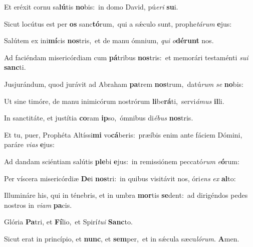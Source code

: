 
Et eréxit cornu sa\textbf{lú}tis \textbf{no}bis:~\redgreheightstar in domo David, pú\textit{e}\textit{ri} \textbf{su}i.

Sicut locútus est per \textbf{os} sanc\textbf{tó}rum,~\redgreheightstar qui a sǽculo sunt, prophe\textit{tá}\textit{rum} \textbf{e}jus:

Salútem ex ini\textbf{mí}cis \textbf{nos}tris,~\redgreheightstar et de manu ómnium, \textit{qui} \textit{o}\textbf{dé}\textbf{runt} nos.

Ad faciéndam misericórdiam cum \textbf{pá}tribus \textbf{nos}tris:~\redgreheightstar et memorári testaménti \textit{su}\textit{i} \textbf{sanc}ti.

Jusjurándum, quod jurávit ad Abraham \textbf{pa}trem \textbf{nos}trum,~\redgreheightstar datú\textit{rum} \textit{se} \textbf{no}bis:

Ut sine timóre, de manu inimicórum nostrórum \textbf{li}be\textbf{rá}ti,~\redgreheightstar servi\textit{á}\textit{mus} \textbf{il}li.

In sanctitáte, et justítia \textbf{co}ram \textbf{ip}so,~\redgreheightstar ómnibus di\textit{é}\textit{bus} \textbf{nos}tris.

Et tu, puer, Prophéta Altíssi\textbf{mi} vo\textbf{cá}beris:~\redgreheightstar præíbis enim ante fáciem Dómini, paráre \textit{vi}\textit{as} \textbf{e}jus:

Ad dandam sciéntiam salútis \textbf{ple}bi \textbf{e}jus:~\redgreheightstar in remissiónem peccató\textit{rum} \textit{e}\textbf{ó}rum:

Per víscera misericórdiæ \textbf{De}i \textbf{nos}tri:~\redgreheightstar in quibus visitávit nos, óri\textit{ens} \textit{ex} \textbf{al}to:

Illumináre his, qui in ténebris, et in umbra \textbf{mor}tis \textbf{se}dent:~\redgreheightstar ad dirigéndos pedes nostros in \textit{vi}\textit{am} \textbf{pa}cis.

Glória \textbf{Pa}tri, et \textbf{Fí}lio,~\redgreheightstar et Spirí\textit{tu}\textit{i} \textbf{Sanc}to.

Sicut erat in princípio, et \textbf{nunc}, et \textbf{sem}per,~\redgreheightstar et in sǽcula sæcu\textit{ló}\textit{rum}. \textbf{A}men.
